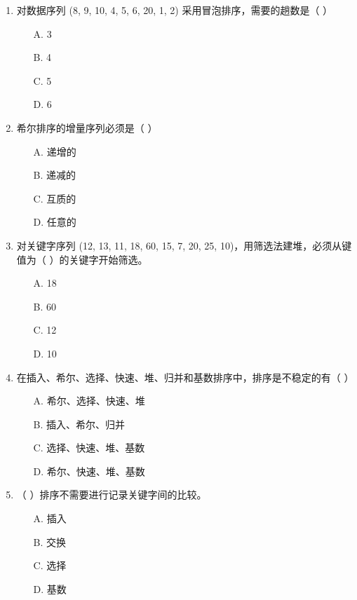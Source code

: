 \documentclass[12pt, a4paper]{article}
\begin{document}
\begin{enumerate}[label=\arabic*.]
	\item 对数据序列 (8, 9, 10, 4, 5, 6, 20, 1, 2) 采用冒泡排序，需要的趟数是（ ）
	      \begin{enumerate}
		      \item[A.] 3
		      \item[B.] 4
		      \item[C.] 5
		      \item[D.] 6
	      \end{enumerate}

	\item 希尔排序的增量序列必须是（ ）
	      \begin{enumerate}
		      \item[A.] 递增的
		      \item[B.] 递减的
		      \item[C.] 互质的
		      \item[D.] 任意的
	      \end{enumerate}

	\item 对关键字序列 (12, 13, 11, 18, 60, 15, 7, 20, 25, 10)，用筛选法建堆，必须从键值为（ ）的关键字开始筛选。
	      \begin{enumerate}
		      \item[A.] 18
		      \item[B.] 60
		      \item[C.] 12
		      \item[D.] 10
	      \end{enumerate}

	\item 在插入、希尔、选择、快速、堆、归并和基数排序中，排序是不稳定的有（ ）
	      \begin{enumerate}
		      \item[A.] 希尔、选择、快速、堆
		      \item[B.] 插入、希尔、归并
		      \item[C.] 选择、快速、堆、基数
		      \item[D.] 希尔、快速、堆、基数
	      \end{enumerate}

	\item （ ）排序不需要进行记录关键字间的比较。
	      \begin{enumerate}
		      \item[A.] 插入
		      \item[B.] 交换
		      \item[C.] 选择
		      \item[D.] 基数
	      \end{enumerate}


\end{enumerate}
\end{document}
